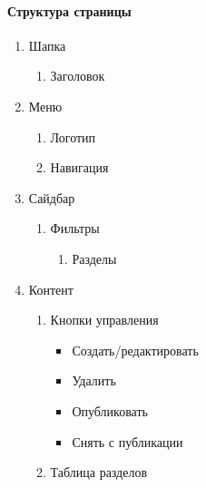 \paragraph{Структура страницы}
\begin{enumerate}
    \item Шапка
    \begin{enumerate}
        \item Заголовок
    \end{enumerate}

    \item Меню
    \begin{enumerate}
        \item Логотип
        \item Навигация
    \end{enumerate}

    \item Сайдбар
    \begin{enumerate}
        \item Фильтры
        \begin{enumerate}
            \item Разделы
        \end{enumerate}
    \end{enumerate}

    \item Контент
    \begin{enumerate}
        \item Кнопки управления
        \begin{itemize}
            \item Создать/редактировать
            \item Удалить
            \item Опубликовать
            \item Снять с публикации
        \end{itemize}
        \item Таблица разделов
    \end{enumerate}
\end{enumerate}

